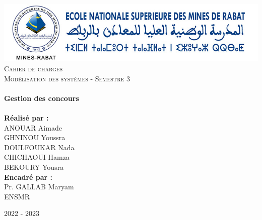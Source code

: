 \begin{titlepage}
    \vbox{ }

    \vbox{ }

    \begin{center}
        \includegraphics[width=1.0\textwidth]{img/logo-ensmr-2.jpg}\\[2,5cm]
        \textsc{\Large Cahier de charges}\\[0.2cm]
        \textsc{\Large Modélisation des systèmes - Semestre 3}\\[0.9cm]

        \noindent\makebox[\linewidth]{\rule{.7\paperwidth}{.6pt}}\\[0.7cm]
        { \huge \bfseries Gestion des concours}\\[0.25cm]
        \noindent\makebox[\linewidth]{\rule{.7\paperwidth}{.6pt}}\\[1.7cm]
        \large{\bfseries Réalisé par :}\\[0.1cm]
        \large{ANOUAR Aimade}\\[0.1cm]
        \large{GHNINOU Youssra }\\[0.1cm]
        \large{DOULFOUKAR Nada}\\[0.1cm]
        \large{CHICHAOUI Hamza}\\[0.1cm]
        \large{BEKOURY Yousra}\\[0.7cm]  
        \large{\bfseries Encadré par :}\\[0.1cm]
        \large{Pr. GALLAB Maryam }\\[2.1cm]
        \vfill
        \large
        ENSMR

            {\large 2022 - 2023}
    \end{center}
\end{titlepage}
